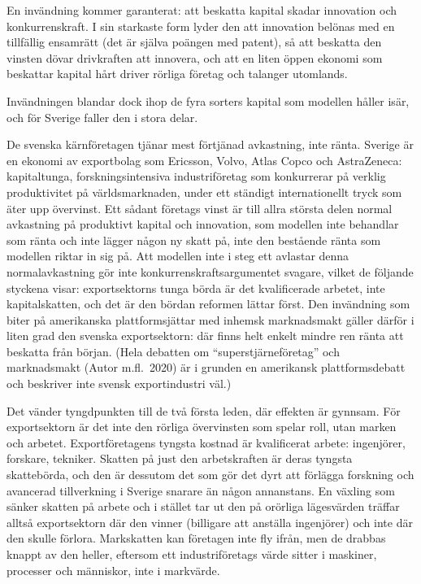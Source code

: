 \documentclass[11pt]{article}
\begin{document}
En invändning kommer garanterat: att beskatta kapital skadar innovation och konkurrenskraft. I sin starkaste form lyder den att innovation belönas med en tillfällig ensamrätt (det är själva poängen med patent), så att beskatta den vinsten dövar drivkraften att innovera, och att en liten öppen ekonomi som beskattar kapital hårt driver rörliga företag och talanger utomlands.

Invändningen blandar dock ihop de fyra sorters kapital som modellen håller isär, och för Sverige faller den i stora delar.

De svenska kärnföretagen tjänar mest förtjänad avkastning, inte ränta. Sverige är en ekonomi av exportbolag som Ericsson, Volvo, Atlas Copco och AstraZeneca: kapitaltunga, forskningsintensiva industriföretag som konkurrerar på verklig produktivitet på världsmarknaden, under ett ständigt internationellt tryck som äter upp övervinst. Ett sådant företags vinst är till allra största delen normal avkastning på produktivt kapital och innovation, som modellen inte behandlar som ränta och inte lägger någon ny skatt på, inte den bestående ränta som modellen riktar in sig på. Att modellen inte i steg ett avlastar denna normalavkastning gör inte konkurrenskraftsargumentet svagare, vilket de följande styckena visar: exportsektorns tunga börda är det kvalificerade arbetet, inte kapitalskatten, och det är den bördan reformen lättar först. Den invändning som biter på amerikanska plattformsjättar med inhemsk marknadsmakt gäller därför i liten grad den svenska exportsektorn: där finns helt enkelt mindre ren ränta att beskatta från början. (Hela debatten om \enquote{superstjärneföretag} och marknadsmakt (Autor m.fl.\ 2020) är i grunden en amerikansk plattformsdebatt och beskriver inte svensk exportindustri väl.)

Det vänder tyngdpunkten till de två första leden, där effekten är gynnsam. För exportsektorn är det inte den rörliga övervinsten som spelar roll, utan marken och arbetet. Exportföretagens tyngsta kostnad är kvalificerat arbete: ingenjörer, forskare, tekniker. Skatten på just den arbetskraften är deras tyngsta skattebörda, och den är dessutom det som gör det dyrt att förlägga forskning och avancerad tillverkning i Sverige snarare än någon annanstans. En växling som sänker skatten på arbete och i stället tar ut den på orörliga lägesvärden träffar alltså exportsektorn där den vinner (billigare att anställa ingenjörer) och inte där den skulle förlora. Markskatten kan företagen inte fly ifrån, men de drabbas knappt av den heller, eftersom ett industriföretags värde sitter i maskiner, processer och människor, inte i markvärde.
\end{document}
